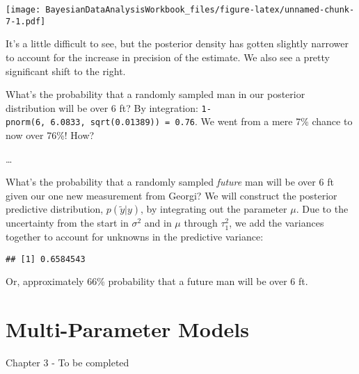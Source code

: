 \documentclass[]{book}
\newenvironment{Shaded}{\begin{snugshade}}{\end{snugshade}}
\newcommand{\KeywordTok}[1]{\textcolor[rgb]{0.13,0.29,0.53}{\textbf{#1}}}
\newcommand{\DecValTok}[1]{\textcolor[rgb]{0.00,0.00,0.81}{#1}}
\newcommand{\StringTok}[1]{\textcolor[rgb]{0.31,0.60,0.02}{#1}}
\newcommand{\OperatorTok}[1]{\textcolor[rgb]{0.81,0.36,0.00}{\textbf{#1}}}
\newcommand{\NormalTok}[1]{#1}
\begin{document}
\texttt{[image: BayesianDataAnalysisWorkbook\_files/figure-latex/unnamed-chunk-7-1.pdf]}

It's a little difficult to see, but the posterior density has gotten
slightly narrower to account for the increase in precision of the
estimate. We also see a pretty significant shift to the right.

What's the probability that a randomly sampled man in our posterior
distribution will be over 6 ft? By integration:
\texttt{1-pnorm(6,\ 6.0833,\ sqrt(0.01389))\ =\ 0.76}. We went from a
mere 7\% chance to now over 76\%! How?

\ldots{}

What's the probability that a randomly sampled \emph{future} man will be
over 6 ft given our one new measurement from Georgi? We will construct
the posterior predictive distribution, \(p(\tilde{y}|y)\), by
integrating out the parameter \(\mu\). Due to the uncertainty from the
start in \(\sigma^2\) and in \(\mu\) through \(\tau_1^2\), we add the
variances together to account for unknowns in the predictive variance:

\begin{Shaded}
\end{Shaded}

\begin{verbatim}
## [1] 0.6584543
\end{verbatim}

Or, approximately 66\% probability that a future man will be over 6 ft.

\chapter{Multi-Parameter Models}\label{multi}

Chapter 3 - To be completed
\end{document}
